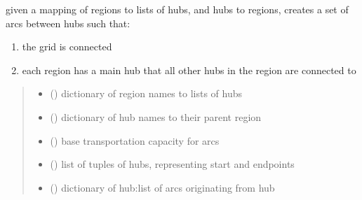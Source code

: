 \documentclass[letterpaper,10pt,english]{sphinxmanual}
\begin{document}
\begin{fulllineitems}
\label{\detokenize{src.sensitivity.babymodel:src.sensitivity.babymodel.connect_regions}}
\pysigstartsignatures
\pysiglinewithargsret
{}
{\sphinxparamcomma {}\sphinxparamcomma {}}
{}
\pysigstopsignatures
\sphinxAtStartPar
given a mapping of regions to lists of hubs, and hubs to regions, creates
a set of arcs between hubs such that:
\begin{enumerate}
%
\item {} 
\sphinxAtStartPar
the grid is connected

\item {} 
\sphinxAtStartPar
each region has a main hub that all other hubs in the region are connected to

\end{enumerate}
\begin{quote}\begin{description}
\begin{itemize}
\item {} 
\sphinxAtStartPar
{} () \textendash{} dictionary of region names to lists of hubs

\item {} 
\sphinxAtStartPar
{} () \textendash{} dictionary of hub names to their parent region

\item {} 
\sphinxAtStartPar
{} () \textendash{} base transportation capacity for arcs

\end{itemize}

\sphinxAtStartPar
\begin{itemize}
\item {} 
\sphinxAtStartPar
{} () \textendash{} list of tuples of hubs, representing start and endpoints

\item {} 
\sphinxAtStartPar
{} () \textendash{} dictionary of hub:list of arcs originating from hub


\end{itemize}
\end{description}
\end{quote}
\end{fulllineitems}
\end{document}
